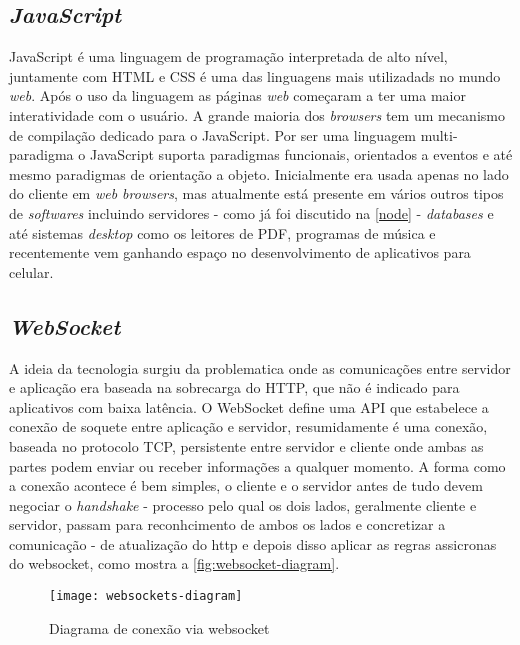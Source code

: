 \subsection[\textit{JavaScript}]{\textit{JavaScript}}\label{js}
JavaScript é uma linguagem de programação interpretada de alto nível, juntamente com HTML e CSS é uma das linguagens mais utilizadads no mundo \textit{web}.
Após o uso da linguagem as páginas \textit{web} começaram a ter uma maior interatividade com o usuário. A grande maioria dos \textit{browsers} tem um
mecanismo de compilação dedicado para o JavaScript. Por ser uma linguagem multi-paradigma o JavaScript suporta paradigmas funcionais, orientados a eventos 
e até mesmo paradigmas de orientação a objeto.
Inicialmente era usada apenas no lado do cliente em \textit{web browsers}, mas atualmente está presente em vários outros tipos de \textit{softwares} incluindo
servidores - como já foi discutido na \autoref{node} - \textit{databases} e até sistemas \textit{desktop} como os leitores de PDF, programas de música e recentemente
vem ganhando espaço no desenvolvimento de aplicativos para celular.

\subsection[\textit{WebSocket}]{\textit{WebSocket}}\label{websocket}
A ideia da tecnologia surgiu da problematica onde as comunicações entre servidor e aplicação era baseada na sobrecarga do HTTP, que não é indicado para aplicativos
com baixa latência. O WebSocket define uma API que estabelece a conexão de soquete entre aplicação e servidor, resumidamente é uma conexão, baseada no protocolo TCP, persistente
entre servidor e cliente onde ambas as partes podem enviar ou receber informações a qualquer momento. A forma como a conexão acontece é bem simples,
o cliente e o servidor antes de tudo devem negociar o \textit{handshake} - processo pelo qual os dois lados, geralmente cliente e servidor, passam para
reconhcimento de ambos os lados e concretizar a comunicação - de atualização do http e depois disso aplicar as regras assicronas do websocket, como mostra
a \autoref{fig:websocket-diagram}.

\begin{figure}[h!]
	\texttt{[image: websockets-diagram]}
	\centering
	\caption[Diagrama de conexão via websocket]{Diagrama de conexão via websocket}
	\label{fig:websocket-diagram}
\end{figure}
\FloatBarrier


